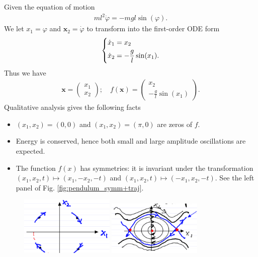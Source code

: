 \begin{ex}[Pendulum]
Given the equation of motion
\begin{align}
	ml^2 \ddot{\varphi} = -mgl \sin(\varphi).
\end{align}
We let $ x_1 = \varphi$ and $ \textbf{x}_2 =\dot{\varphi}$ to transform into the first-order ODE form
\begin{align}
	\begin{dcases}
	\dot{x}_1 = x_2 \\
\dot{x}_2 = - \frac{g}{l} \sin (x_1).
	\end{dcases}
\end{align}
Thus we have 
\begin{align}
 \textbf{x} = 
\begin{pmatrix}
	x_1 \\ x_2
\end{pmatrix}; \quad
f( \textbf{x}) = 
\begin{pmatrix}
	x_2 \\ - \frac{g}{l}\sin(x_1)	
\end{pmatrix}.
\end{align}
Qualitative analysis gives the following facts
\begin{itemize}
	\item $(x_1, x_2) = (0,0)$ and $(x_1, x_2) = (\pi , 0)$ are zeros of $f$.
	\item Energy is conserved, hence both small and large amplitude oscillations are expected.
	\item The function $f(x)$ has symmetries: it is invariant under the transformation $(x_1, x_2, t) \mapsto (x_1, -x_2, -t)$ and $(x_1, x_2, t) \mapsto (-x_1, x_2, -t)$. See the left panel of Fig. \ref{fig:pendulum_symm+traj}.
\end{itemize}
\begin{figure}[h!]
	\centering
	\includegraphics[width=0.4\textwidth]{figures/intro/6pendulum_symmetries.png}
	\hspace{0.05\textwidth}
	\includegraphics[width=0.4\textwidth]{figures/intro/5pendulum.png}

\end{figure}
\end{ex}
